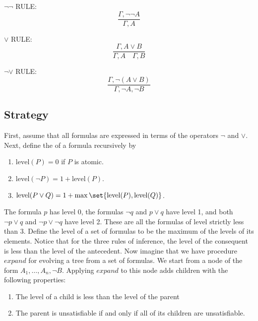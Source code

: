 $\neg\neg$ RULE: $$\frac{\Gamma, \neg\neg A}{\Gamma, A} $$

$\lor$ RULE: $$\frac{\Gamma, A \lor B}{\Gamma, A \quad \Gamma, B} $$

$\neg\lor$ RULE: $$\frac{\Gamma, \neg(A \lor B)}{\Gamma, \neg A, \neg B} $$



\subsection{Strategy}


First, assume that all formulas are expressed in terms of the operators $\neg$ and $\lor$.  Next, define the  of a formula recursively by

\begin{enumerate}

\item $\text{level}(P) = 0$ if $P$ is atomic.

\item  $\text{level}(\neg P) = 1 + \text{level}(P)$.

\item  $\text{level}(P \lor Q) = 1 + \max \set{\text{level}(P), \text{level}(Q)}$.

\end{enumerate}


The formula  $p$ has level 0, the formulas $\neg q$ and $p \lor q$ have  level 1, and both $\neg p \lor q$ and $\neg p \lor \neg q$ have level 2.  These are all the formulas of level strictly less than 3.  Define the level of a set of formulas to be the maximum of the levels of its elements.  Notice that for the three rules of inference, the level of the consequent is less than the level of the antecedent. Now imagine that we have procedure $expand$ for evolving a tree from a set of formulas. We start from a node of the form $A_1, \ldots, A_n, \neg B$.  Applying $expand$ to this node adds children with the following properties:

\begin{enumerate}
  \item The level of a child is less than the level of the parent
 \item  The parent is unsatisfiable if and only if all of its children are unsatisfiable.
\end{enumerate}

